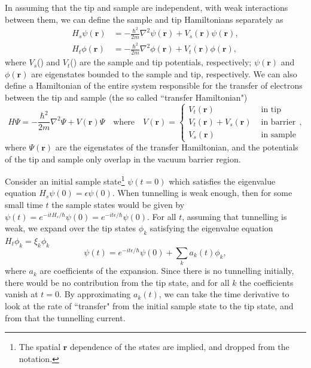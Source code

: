In assuming that the tip and sample are independent, with weak interactions between them, we can define the sample and tip Hamiltonians separately as
\begin{align}
H_{s}\psi(\pmb{r}) &= -\frac{\hbar^2}{2m} \nabla^2 \psi(\pmb{r}) + V_{s}(\pmb{r}) \psi(\pmb{r}), \\
H_{t}\phi(\pmb{r}) &= -\frac{\hbar^2}{2m} \nabla^2 \phi(\pmb{r}) + V_{t}(\pmb{r}) \phi(\pmb{r}) ,
\end{align}
where $V_s$() and $V_t$() are the sample and tip potentials, respectively; $\psi(\pmb{r})$ and $\phi(\pmb{r})$ are eigenstates bounded to the sample and tip, respectively. We can also define a Hamiltonian of the entire system responsible for the transfer of electrons between the tip and sample (the so called ``transfer Hamiltonian")
\begin{equation} \label{eq:exptech:transH}
H\Psi = - \frac{\hbar^2}{2m} \nabla^2 \Psi + V(\pmb{r}) \Psi \quad \textrm{where} \quad V(\pmb{r}) = 
\begin{cases}
V_t(\pmb{r}) & \textrm{ in tip} \\
V_t(\pmb{r}) + V_s(\pmb{r}) & \textrm{ in barrier} \\
V_s(\pmb{r}) & \textrm{ in sample}
\end{cases},
\end{equation}
where $\Psi(\pmb{r})$ are the eigenstates of the transfer Hamiltonian, and the potentials of the tip and sample only overlap in the vacuum barrier region.

\sloppy Consider an initial sample state\footnote{The spatial $\pmb{r}$ dependence of the states are implied, and dropped from the notation.} $\psi(t=0)$ which satisfies the eigenvalue equation $H_{s}\psi(0) = \epsilon \psi(0)$. When tunnelling is weak enough, then for some small time $t$ the sample states would be given by $\psi(t) = e^{-itH_{s}/\hbar} \psi(0) = e^{-it\epsilon/\hbar} \psi(0) $. For all $t$, assuming that tunnelling is weak, we expand over the tip states $\phi_k$ satisfying the eigenvalue equation $H_{t}\phi_k = \xi_k \phi_k$
\begin{equation} \label{eq:exptech:state}
\psi(t) = e^{-it\epsilon/\hbar} \psi(0) + \sum_k a_k(t) \phi_k,
\end{equation}
where $a_k$ are coefficients of the expansion. Since there is no tunnelling initially, there would be no contribution from the tip state, and for all $k$ the coefficients vanish at $t=0$. By approximating $a_k(t)$, we can take the time derivative to look at the rate of ``transfer" from the initial sample state to the tip state, and from that the tunnelling current.

